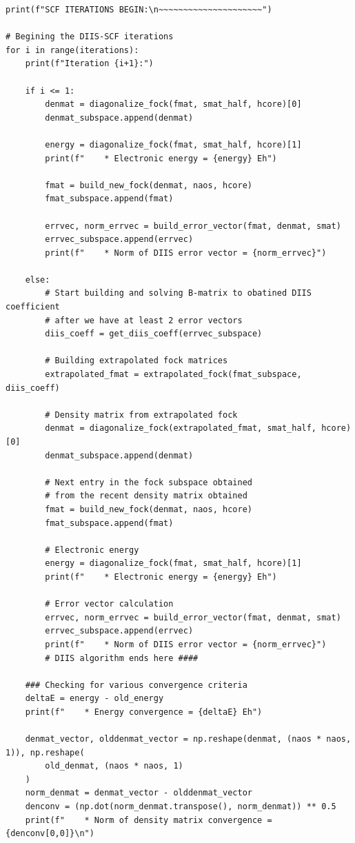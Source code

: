 \begin{lstlisting}[style=MyPython]
print(f"SCF ITERATIONS BEGIN:\n~~~~~~~~~~~~~~~~~~~~~")

# Begining the DIIS-SCF iterations
for i in range(iterations):
    print(f"Iteration {i+1}:")

    if i <= 1:
        denmat = diagonalize_fock(fmat, smat_half, hcore)[0]
        denmat_subspace.append(denmat)

        energy = diagonalize_fock(fmat, smat_half, hcore)[1]
        print(f"    * Electronic energy = {energy} Eh")

        fmat = build_new_fock(denmat, naos, hcore)
        fmat_subspace.append(fmat)

        errvec, norm_errvec = build_error_vector(fmat, denmat, smat)
        errvec_subspace.append(errvec)
        print(f"    * Norm of DIIS error vector = {norm_errvec}")

    else:
        # Start building and solving B-matrix to obatined DIIS coefficient
        # after we have at least 2 error vectors
        diis_coeff = get_diis_coeff(errvec_subspace)

        # Building extrapolated fock matrices
        extrapolated_fmat = extrapolated_fock(fmat_subspace, diis_coeff)

        # Density matrix from extrapolated fock
        denmat = diagonalize_fock(extrapolated_fmat, smat_half, hcore)[0]
        denmat_subspace.append(denmat)

        # Next entry in the fock subspace obtained
        # from the recent density matrix obtained
        fmat = build_new_fock(denmat, naos, hcore)
        fmat_subspace.append(fmat)

        # Electronic energy
        energy = diagonalize_fock(fmat, smat_half, hcore)[1]
        print(f"    * Electronic energy = {energy} Eh")

        # Error vector calculation
        errvec, norm_errvec = build_error_vector(fmat, denmat, smat)
        errvec_subspace.append(errvec)
        print(f"    * Norm of DIIS error vector = {norm_errvec}")
        # DIIS algorithm ends here ####

    ### Checking for various convergence criteria
    deltaE = energy - old_energy
    print(f"    * Energy convergence = {deltaE} Eh")

    denmat_vector, olddenmat_vector = np.reshape(denmat, (naos * naos, 1)), np.reshape(
        old_denmat, (naos * naos, 1)
    )
    norm_denmat = denmat_vector - olddenmat_vector
    denconv = (np.dot(norm_denmat.transpose(), norm_denmat)) ** 0.5
    print(f"    * Norm of density matrix convergence = {denconv[0,0]}\n")


\end{lstlisting}
